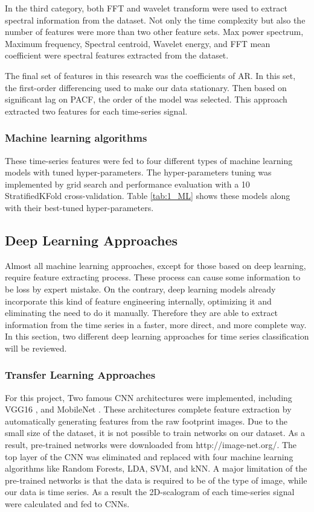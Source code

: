 In the third category, both FFT and wavelet transform were used to extract spectral information from the dataset. Not only the time complexity but also the number of features were more than two other feature sets. 
Max power spectrum, Maximum frequency, Spectral centroid, Wavelet energy, and FFT mean coefficient were spectral features extracted from the dataset.

The final set of features in this research was the coefficients of \gls{AR}. In this set, the first-order differencing used to make our data stationary. Then based on significant lag on \gls{PACF}, the order of the model  was selected. This approach extracted two features for each time-series signal.

\subsubsection{Machine learning algorithms}

These time-series features were fed to four different types of machine learning models with tuned hyper-parameters. The hyper-parameters tuning was implemented by grid search and performance evaluation with a 10  StratifiedKFold cross-validation. Table \ref{tab:1_ML} shows these models along with their best-tuned hyper-parameters.

\subsection{Deep Learning Approaches}
  

Almost all machine learning approaches, except for those based on deep learning, require feature extracting process. These process can cause some information to be loss by expert mistake. On the contrary, deep learning models already incorporate this kind of feature engineering internally, optimizing it and eliminating the need to do it manually. Therefore they are able to extract information from the time series in a faster, more direct, and more complete way. In this section, two different deep learning approaches for time series classification will be reviewed.


\subsubsection{Transfer Learning Approaches}
For this project, Two famous CNN architectures were implemented, including VGG16 \cite{Simonyan2015VeryRecognition}, and MobileNet \cite{Howard2017MobileNets:Applications}. These architectures complete feature extraction by automatically generating features from the raw footprint images. 
Due to the small size of the dataset, it is not possible to train networks on our dataset. As a result, pre-trained networks were downloaded from http://image-net.org/. The top layer of the CNN was eliminated and replaced with four machine learning algorithms like Random Forests, LDA, SVM, and kNN. 
A major limitation of the pre-trained networks is that the data is required to be of the type of image, while our data is time series. As a result the 2D-scalogram of each time-series signal were calculated and fed to CNNs. 


